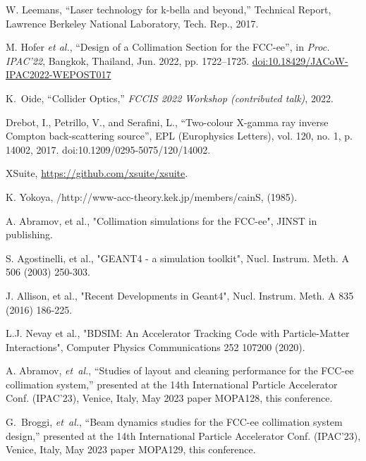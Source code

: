 \documentclass[a4paper,
    keeplastbox,   %
]{jacow}
\begin{document}
{\begin{thebibliography}{99}
             W. Leemans, “Laser technology for k-bella and beyond,” Technical Report, Lawrence Berkeley National Laboratory, Tech. Rep., 2017.

             M. Hofer \emph{et al.}, \textquotedblleft{Design of a Collimation Section for the FCC-ee}\textquotedblright, in \emph{Proc. IPAC’22}, Bangkok, Thailand, Jun. 2022, pp. 1722--1725. \url{doi:10.18429/JACoW-IPAC2022-WEPOST017}

            K.~Oide, ``{Collider Optics},'' {\em {FCCIS 2022 Workshop (contributed talk)}}, 2022.

             Drebot, I., Petrillo, V., and Serafini, L., “Two-colour X-gamma ray inverse Compton back-scattering source”, EPL (Europhysics Letters), vol. 120, no. 1, p. 14002, 2017. doi:10.1209/0295-5075/120/14002.

             XSuite, \url{https://github.com/xsuite/xsuite}.

             K. Yokoya, /http://www-acc-theory.kek.jp/members/cainS, (1985).

             A. Abramov, et al., "Collimation simulations for the FCC-ee", JINST in publishing.

             S. Agostinelli, et al., "GEANT4 - a simulation toolkit", Nucl. Instrum. Meth. A 506 (2003) 250-303.

             J. Allison, et al., "Recent Developments in Geant4", Nucl. Instrum. Meth. A 835 (2016) 186-225.

             L.J. Nevay et al., "BDSIM: An Accelerator Tracking Code with Particle-Matter Interactions", Computer Physics Communications 252 107200 (2020).

             A. Abramov, {\em et~al.}, ``{Studies of layout and cleaning performance for the FCC-ee collimation system},'' presented at the 14th International Particle Accelerator Conf. (IPAC’23), Venice, Italy, May 2023 paper MOPA128, this conference.

             G.~Broggi, {\em et~al.}, ``{Beam dynamics studies for the FCC-ee collimation system design},'' presented at the 14th International Particle Accelerator Conf. (IPAC’23), Venice, Italy, May 2023 paper MOPA129, this conference.
        \end{thebibliography}
    }
%
%

\end{document}
